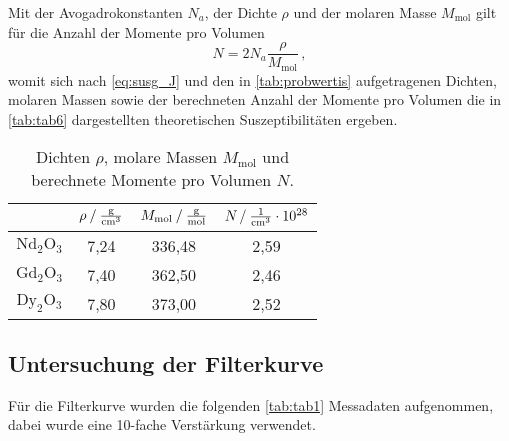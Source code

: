Mit der Avogadrokonstanten $N_a$, der Dichte $\rho$ und der molaren Masse $M_\text{mol}$ gilt für die Anzahl der Momente pro Volumen
\begin{equation}
    N = 2 N_a \dfrac{\rho}{M_\text{mol}} \,,
\end{equation}
womit sich nach \eqref{eq:susg_J} und den in \autoref{tab:probwertis} aufgetragenen Dichten, molaren Massen sowie der berechneten Anzahl der Momente pro Volumen
die in \autoref{tab:tab6} dargestellten theoretischen Suszeptibilitäten ergeben.

\begin{table}[H]
    \centering
    \caption{Dichten $\rho$, molare Massen $M_\text{mol}$ und berechnete Momente pro Volumen $N$.}
    \label{tab:probwertis}
    \begin{tabular}{S S[table-format=1.2] S[table-format=3.2] S[table-format=1.2]}
      \toprule
      {} & {$\rho \mathbin{/} \unit{\frac{\gram}{{\centi\meter}^3}}$} & {$M_\text{mol} \mathbin{/} \unit{\frac{\gram}{\mol}}$} & {$N \mathbin{/} \unit{\frac{1}{{\centi\meter}^3}} \cdot 10^{28}$}  \\
      \midrule
      {$\text{Nd}_2\text{O}_3$}         &           7,24          &         336,48          &           2,59            \\
      {$\text{Gd}_2\text{O}_3$}         &           7,40          &         362,50          &           2,46            \\
      {$\text{Dy}_2\text{O}_3$}         &           7,80          &         373,00          &           2,52            \\
      \bottomrule
    \end{tabular}
\end{table}



\subsection{Untersuchung der Filterkurve}

Für die Filterkurve wurden die folgenden \autoref{tab:tab1} Messadaten aufgenommen, dabei wurde eine 10-fache Verstärkung verwendet.


